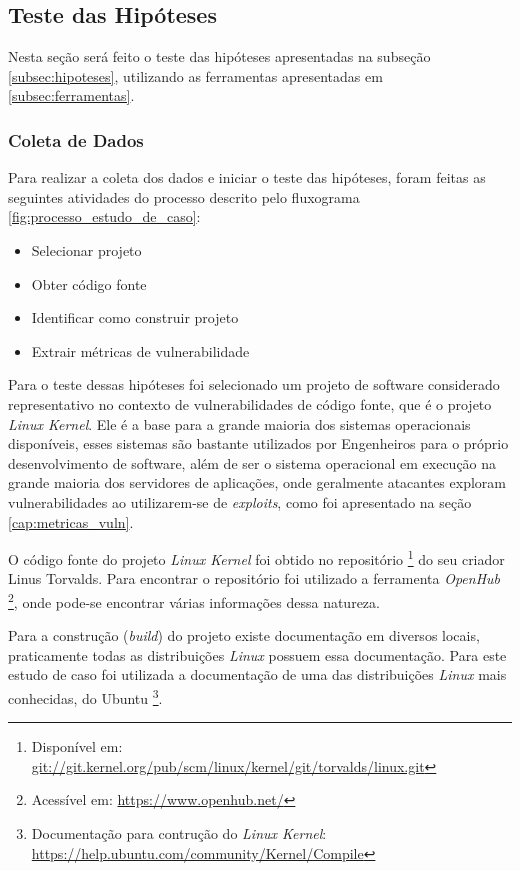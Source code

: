 \subsection{Teste das Hipóteses} \label{subsec:teste_hipotese}

Nesta seção será feito o teste das hipóteses apresentadas na subseção
\ref{subsec:hipoteses}, utilizando as ferramentas apresentadas em \ref{subsec:ferramentas}.

\subsubsection{Coleta de Dados}

Para realizar a coleta dos dados e iniciar o teste das hipóteses, foram
feitas as seguintes atividades do processo descrito pelo fluxograma
\ref{fig:processo_estudo_de_caso}:

\begin{itemize}
  \item Selecionar projeto
  \item Obter código fonte
  \item Identificar como construir projeto
  \item Extrair métricas de vulnerabilidade
\end{itemize}

Para o teste dessas hipóteses foi selecionado um projeto de software considerado
representativo no contexto de vulnerabilidades de código fonte, que é o projeto
\emph{Linux Kernel}. Ele é a base para a grande maioria dos sistemas operacionais
disponíveis, esses sistemas são bastante utilizados por Engenheiros para
o próprio desenvolvimento de software, além de ser o sistema operacional em
execução na grande maioria dos servidores de aplicações, onde geralmente
atacantes exploram vulnerabilidades ao utilizarem-se de \textit{exploits}, como
foi apresentado na seção \ref{cap:metricas_vuln}.

O código fonte do projeto \emph{Linux Kernel} foi obtido no repositório \footnote{Disponível em:
\url{git://git.kernel.org/pub/scm/linux/kernel/git/torvalds/linux.git}} do seu
criador Linus Torvalds. Para encontrar o repositório foi utilizado a ferramenta
\emph{OpenHub} \footnote{Acessível em: \url{https://www.openhub.net/}}, onde
pode-se encontrar várias informações dessa natureza.

Para a construção (\textit{build}) do projeto existe documentação em diversos
locais, praticamente todas as distribuições \emph{Linux} possuem essa
documentação. Para este estudo de caso foi utilizada a documentação de uma das
distribuições \emph{Linux} mais conhecidas, do Ubuntu \footnote{Documentação para
  contrução do \emph{Linux Kernel}:
\url{https://help.ubuntu.com/community/Kernel/Compile}}.

